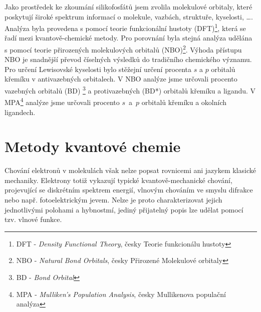 \documentclass[
  digital, %
  table,   %
  lof,     %
  lot,     %
  oneside,
]{fithesis3}
\begin{document}
Jako prostředek ke zkoumání silikofosfátů jsem zvolila molekulové orbitaly, které poskytují široké spektrum informací o molekule, vazbách, struktuře, kyselosti, \dots.  Analýza byla provedena s pomocí teorie funkcionální hustoty (DFT)\footnote{DFT - \textit{Density Functional Theory}, česky Teorie funkcionálu hustoty}, která se řadí mezi kvantově-chemické metody. Pro porovnání byla stejná analýza udělána s pomocí teorie přirozených molekulových orbitalů (NBO)\footnote{NBO - \textit{Natural Bond Orbitals}, česky Přirozené Molekulové orbitaly}. Výhoda přístupu NBO je snadnější převod číselných výsledků do tradičního chemického významu. Pro určení Lewisovské kyselosti bylo stěžejní určení procenta $s$ a $p$ orbitalů křemíku v antivazebných orbitalech.  V NBO analýze jsme určovali procento vazebných orbitalů (BD) \footnote{BD - \textit{Bond Orbital}} a protivazebných (BD*) orbitalů křemíku a ligandu. V MPA\footnote{MPA - \textit{Mulliken's Population Analysis}, česky Mullikenova populační analýza} analýze jsme určovali procento $s$~a~$p$ orbitalů křemíku a okolních ligandech.
\newpage

\chapter{Metody kvantové chemie}
Chování elektronů v molekulách však nelze popsat rovnicemi ani jazykem klasické mechaniky. Elektrony totiž vykazují typické kvantově-mechanické chování, projevující se diskrétním spektrem energií, vlnovým chováním ve smyslu difrakce nebo např. fotoelektrickým jevem. Nelze je proto charakterizovat jejich jednotlivými polohami a hybnostmí, jediný přijatelný popis lze udělat pomocí tzv. vlnové funkce.
\end{document}
